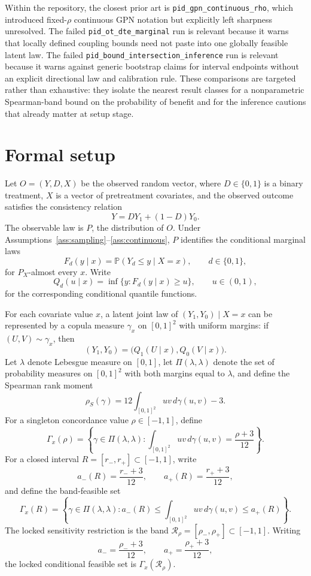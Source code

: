 \documentclass[11pt]{article}
\renewcommand{\Pr}{\mathbb{P}}
\theoremstyle{definition}
\theoremstyle{plain}
\theoremstyle{remark}
\begin{document}
Within the repository, the closest prior art is \texttt{pid\_gpn\_continuous\_rho}, which introduced fixed-\(\rho\) continuous GPN notation but explicitly left sharpness unresolved.  The failed \texttt{pid\_ot\_dte\_marginal} run is relevant because it warns that locally defined coupling bounds need not paste into one globally feasible latent law.  The failed \texttt{pid\_bound\_intersection\_inference} run is relevant because it warns against generic bootstrap claims for interval endpoints without an explicit directional law and calibration rule.  These comparisons are targeted rather than exhaustive: they isolate the nearest result classes for a nonparametric Spearman-band bound on the probability of benefit and for the inference cautions that already matter at setup stage.

\section{Formal setup}
\label{sec:setup}
Let \(O=(Y,D,X)\) be the observed random vector, where \(D\in\{0,1\}\) is a binary treatment, \(X\) is a vector of pretreatment covariates, and the observed outcome satisfies the consistency relation
\[
Y=DY_1+(1-D)Y_0.
\]
The observable law is \(P\), the distribution of \(O\).  Under Assumptions~\ref{ass:sampling}--\ref{ass:continuous}, \(P\) identifies the conditional marginal laws
\[
F_d(y\mid x)=\Pr(Y_d\le y\mid X=x),\qquad d\in\{0,1\},
\]
for \(P_X\)-almost every \(x\).  Write
\[
Q_d(u\mid x)=\inf\{y:F_d(y\mid x)\ge u\},\qquad u\in(0,1),
\]
for the corresponding conditional quantile functions.

For each covariate value \(x\), a latent joint law of \((Y_1,Y_0)\mid X=x\) can be represented by a copula measure \(\gamma_x\) on \([0,1]^2\) with uniform margins: if \((U,V)\sim\gamma_x\), then
\[
(Y_1,Y_0)=\bigl(Q_1(U\mid x),Q_0(V\mid x)\bigr).
\]
Let \(\lambda\) denote Lebesgue measure on \([0,1]\), let \(\Pi(\lambda,\lambda)\) denote the set of probability measures on \([0,1]^2\) with both margins equal to \(\lambda\), and define the Spearman rank moment
\[
\rho_S(\gamma)=12\int_{[0,1]^2}uv\,d\gamma(u,v)-3.
\]
For a singleton concordance value \(\rho\in[-1,1]\), define
\[
\Gamma_x(\rho)=\left\{\gamma\in\Pi(\lambda,\lambda):\int_{[0,1]^2}uv\,d\gamma(u,v)=\frac{\rho+3}{12}\right\}.
\]
For a closed interval \(R=[r_-,r_+]\subset[-1,1]\), write
\[
a_-(R)=\frac{r_-+3}{12},\qquad a_+(R)=\frac{r_++3}{12},
\]
and define the band-feasible set
\[
\Gamma_x(R)=\left\{\gamma\in\Pi(\lambda,\lambda):a_-(R)\le \int_{[0,1]^2}uv\,d\gamma(u,v)\le a_+(R)\right\}.
\]
The locked sensitivity restriction is the band \(\mathcal R_\rho=[\rho_-,\rho_+]\subset[-1,1]\).  Writing
\[
a_-=\frac{\rho_-+3}{12},\qquad a_+=\frac{\rho_++3}{12},
\]
the locked conditional feasible set is \(\Gamma_x(\mathcal R_\rho)\).
\end{document}
